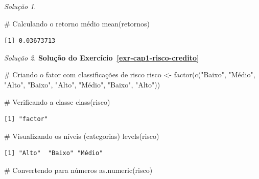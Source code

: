 \documentclass[
  portuguese,
  letterpaper,
  DIV=11,
  numbers=noendperiod]{scrreprt}
\newenvironment{Shaded}{\begin{snugshade}}{\end{snugshade}}
\newcommand{\CommentTok}[1]{\textcolor[rgb]{0.37,0.37,0.37}{#1}}
\newcommand{\FunctionTok}[1]{\textcolor[rgb]{0.28,0.35,0.67}{#1}}
\newcommand{\NormalTok}[1]{\textcolor[rgb]{0.00,0.23,0.31}{#1}}
\newcommand{\OtherTok}[1]{\textcolor[rgb]{0.00,0.23,0.31}{#1}}
\newcommand{\StringTok}[1]{\textcolor[rgb]{0.13,0.47,0.30}{#1}}
\theoremstyle{definition}
\theoremstyle{remark}
\newtheorem*{solution}{Solução}
\begin{document}
\begin{solution}
\begin{Shaded}
\begin{Highlighting}[]
\CommentTok{\# Calculando o retorno médio}
\FunctionTok{mean}\NormalTok{(retornos)}
\end{Highlighting}
\end{Shaded}

\begin{verbatim}
[1] 0.03673713
\end{verbatim}

\end{solution}

\begin{solution}
\textbf{Solução do Exercício~\ref{exr-cap1-risco-credito}}

\begin{Shaded}
\begin{Highlighting}[]
\CommentTok{\# Criando o fator com classificações de risco}
\NormalTok{risco }\OtherTok{\textless{}{-}} \FunctionTok{factor}\NormalTok{(}\FunctionTok{c}\NormalTok{(}\StringTok{"Baixo"}\NormalTok{, }\StringTok{"Médio"}\NormalTok{, }\StringTok{"Alto"}\NormalTok{, }\StringTok{"Baixo"}\NormalTok{, }\StringTok{"Alto"}\NormalTok{, }\StringTok{"Médio"}\NormalTok{, }\StringTok{"Baixo"}\NormalTok{, }\StringTok{"Alto"}\NormalTok{))}

\CommentTok{\# Verificando a classe}
\FunctionTok{class}\NormalTok{(risco)}
\end{Highlighting}
\end{Shaded}

\begin{verbatim}
[1] "factor"
\end{verbatim}

\begin{Shaded}
\begin{Highlighting}[]
\CommentTok{\# Visualizando os níveis (categorias)}
\FunctionTok{levels}\NormalTok{(risco)}
\end{Highlighting}
\end{Shaded}

\begin{verbatim}
[1] "Alto"  "Baixo" "Médio"
\end{verbatim}

\begin{Shaded}
\begin{Highlighting}[]
\CommentTok{\# Convertendo para números}
\FunctionTok{as.numeric}\NormalTok{(risco)}
\end{Highlighting}
\end{Shaded}


\end{solution}
\end{document}
